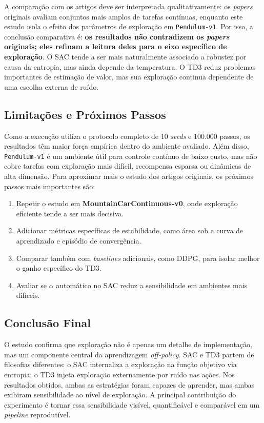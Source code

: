 \documentclass{Supervised_Reinforcement_Learningqsport}
\begin{document}
A comparação com os artigos deve ser interpretada qualitativamente: os \textit{papers} originais avaliam conjuntos mais amplos de tarefas contínuas, enquanto este estudo isola o efeito dos parâmetros de exploração em \texttt{Pendulum-v1}. Por isso, a conclusão comparativa é: \textbf{os resultados não contradizem os \textit{papers} originais; eles refinam a leitura deles para o eixo específico de exploração}. O SAC tende a ser mais naturalmente associado a robustez por causa da entropia, mas ainda depende da temperatura. O TD3 reduz problemas importantes de estimação de valor, mas sua exploração continua dependente de uma escolha externa de ruído.

\subsection{Limitações e Próximos Passos}

Como a execução utiliza o protocolo completo de 10 \textit{seeds} e 100.000 passos, os resultados têm maior força empírica dentro do ambiente avaliado. Além disso, \texttt{Pendulum-v1} é um ambiente útil para controle contínuo de baixo custo, mas não cobre tarefas com exploração mais difícil, recompensa esparsa ou dinâmicas de alta dimensão. Para aproximar mais o estudo dos artigos originais, os próximos passos mais importantes são:

\begin{enumerate}
    \item Repetir o estudo em \textbf{MountainCarContinuous-v0}, onde exploração eficiente tende a ser mais decisiva.
    \item Adicionar métricas específicas de estabilidade, como área sob a curva de aprendizado e episódio de convergência.
    \item Comparar também com \textit{baselines} adicionais, como DDPG, para isolar melhor o ganho específico do TD3.
    \item Avaliar se $\alpha$ automático no SAC reduz a sensibilidade em ambientes mais difíceis.
\end{enumerate}

\subsection{Conclusão Final}

O estudo confirma que exploração não é apenas um detalhe de implementação, mas um componente central da aprendizagem \textit{off-policy}. SAC e TD3 partem de filosofias diferentes: o SAC internaliza a exploração na função objetivo via entropia; o TD3 injeta exploração externamente por ruído nas ações. Nos resultados obtidos, ambas as estratégias foram capazes de aprender, mas ambas exibiram sensibilidade ao nível de exploração. A principal contribuição do experimento é tornar essa sensibilidade visível, quantificável e comparável em um \textit{pipeline} reprodutível.
\end{document}
